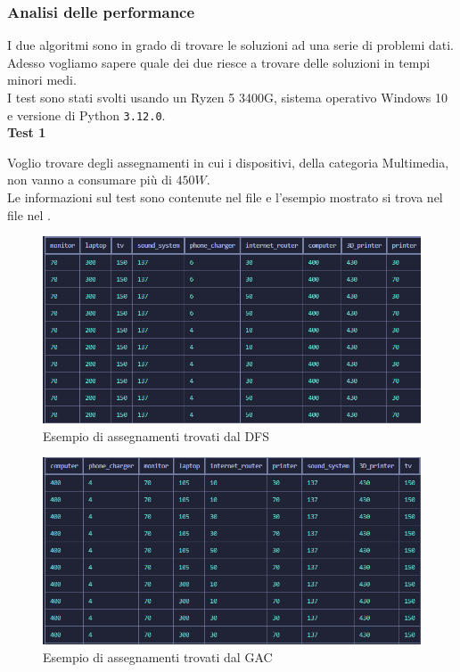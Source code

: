 \documentclass[12pt, letterpaper]{article}
\begin{document}
\subsubsection{Analisi delle performance}

I due algoritmi sono in grado di trovare le soluzioni ad una serie di problemi dati. Adesso vogliamo sapere quale
dei due riesce a trovare delle soluzioni in tempi minori medi. \\

\noindent I test sono stati svolti usando un Ryzen 5 3400G, sistema operativo Windows 10 e
versione di Python \texttt{3.12.0}. \\


\noindent \textbf{Test 1}

\noindent Voglio trovare degli assegnamenti in cui i dispositivi, della
categoria Multimedia, non vanno a consumare più di $450W$. \\

\noindent Le informazioni sul test sono contenute nel file  e
l'esempio mostrato si trova nel file nel . \\

\begin{figure}[h]
      \centering
      \includegraphics[scale=0.65]{assegnmanenti-dfs.png}
      \caption{Esempio di assegnamenti trovati dal DFS}
\end{figure}

\begin{figure}[h]
      \centering
      \includegraphics[scale=0.65]{assegnamenti-gac.png}
      \caption{Esempio di assegnamenti trovati dal GAC}
\end{figure}
\end{document}
